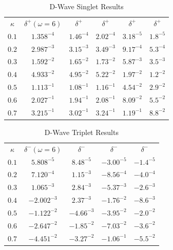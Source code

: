 \documentclass[preprint,showpacs,preprintnumbers,amsmath,amssymb]{revtex4}
\begin{document}
\begin{table}
\begin{center}
\begin{ruledtabular}
\begin{tabular}{c c c c c c}
$\kappa$ & $\delta^+ (\omega = 6)$ & $\delta^+$ \cite{Blackwood2002} & $\delta^+$ \cite{Walters2004} & $\delta^+$ \cite{Ray1997} & $\delta^+$ \cite{Adhikari1999} \\
\colrule
$0.1$ & $1.358^{-4}$ & $1.46^{-4}$ & $2.02^{-4}$ & $3.18^{-5}$ & $1.8^{-5}$ \\
$0.2$ & $2.987^{-3}$ & $3.15^{-3}$ & $3.49^{-3}$ & $9.17^{-4}$ & $5.3^{-4}$ \\
$0.3$ & $1.592^{-2}$ & $1.65^{-2}$ & $1.73^{-2}$ & $5.87^{-3}$ & $3.5^{-3}$ \\
$0.4$ & $4.933^{-2}$ & $4.95^{-2}$ & $5.22^{-2}$ & $1.97^{-2}$ & $1.2^{-2}$ \\
$0.5$ & $1.113^{-1}$ & $1.08^{-1}$ & $1.16^{-1}$ & $4.54^{-2}$ & $2.9^{-2}$ \\
$0.6$ & $2.027^{-1}$ & $1.94^{-1}$ & $2.08^{-1}$ & $8.09^{-2}$ & $5.5^{-2}$ \\
$0.7$ & $3.215^{-1}$ & $3.02^{-1}$ & $3.24^{-1}$ & $1.19^{-1}$ & $8.8^{-2}$ \\
\end{tabular}
\end{ruledtabular}
\caption{D-Wave Singlet Results}
\label{tab:DWaveSinglet}
\end{center}
\end{table}


\begin{table}
\begin{center}
\begin{ruledtabular}
\begin{tabular}{c c c c c}
$\kappa$ & $\delta^- (\omega = 6)$ & $\delta^-$ \cite{Blackwood2002} & $\delta^-$ \cite{Ray1997} & $\delta^-$ \cite{Adhikari1999} \\
\colrule
$0.1$ & $5.808^{-5}$ & $8.48^{-5}$ & $-3.00^{-5}$ & $-1.4^{-5}$ \\
$0.2$ & $7.120^{-4}$ & $1.15^{-3}$ & $-8.56^{-4}$ & $-4.0^{-4}$ \\
$0.3$ & $1.065^{-3}$ & $2.84^{-3}$ & $-5.37^{-3}$ & $-2.6^{-3}$ \\
$0.4$ & $-2.002^{-3}$ & $2.37^{-3}$ & $-1.76^{-2}$ & $-8.6^{-3}$ \\
$0.5$ & $-1.122^{-2}$ & $-4.66^{-3}$ & $-3.95^{-2}$ & $-2.0^{-2}$ \\
$0.6$ & $-2.647^{-2}$ & $-1.85^{-2}$ & $-7.03^{-2}$ & $-3.6^{-2}$ \\
$0.7$ & $-4.451^{-2}$ & $-3.27^{-2}$ & $-1.06^{-1}$ & $-5.5^{-2}$ \\
\end{tabular}
\end{ruledtabular}
\caption{D-Wave Triplet Results}
\label{tab:DWaveTriplet}
\end{center}
\end{table}
\end{document}
